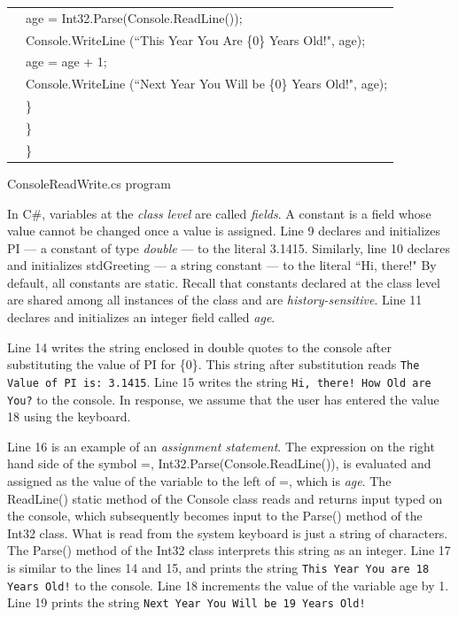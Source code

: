 \begin{program}
\begin{tabular}{ >{\codelinenumfont}c >{\codelistingfont}l}
16 & \hspace{0.6in} age = Int32.Parse(Console.ReadLine()); \\
17 & \hspace{0.6in} Console.WriteLine (``This Year You Are \{0\} Years Old!", age); \\
18 & \hspace{0.6in} age = age + 1; \\
19 & \hspace{0.6in} Console.WriteLine (``Next Year You Will be \{0\} Years Old!", age); \\
20 & \hspace{0.4in} \} \\
21 & \hspace{0.2in} \} \\
22 & \}
\end{tabular}
\caption{ConsoleReadWrite.cs program} \label{tab:ConsoleReadWrite}
\end{program}
\renewcommand{\baselinestretch}{1.0}


In C\#, variables at the \emph{class level} are called
\emph{fields}. A constant is a field whose value cannot be changed
once a value is assigned. Line 9 declares and initializes PI --- a
constant of type \emph{double} --- to the literal 3.1415.
Similarly, line 10 declares and initializes stdGreeting
--- a string constant --- to the literal ``Hi, there!" By default,
all constants are static. Recall that constants declared at the
class level are shared among all instances of the class and are
\emph{history-sensitive}. Line 11 declares and initializes an
integer field called \emph{age}.


Line 14 writes the string enclosed in double quotes to the console
after substituting the value of PI for \{0\}. This string after
substitution reads \texttt{The Value of PI is: 3.1415}. Line 15
writes the string \texttt{Hi, there! How Old are You?} to the
console. In response, we assume that the user has entered the
value 18 using the keyboard.


Line 16 is an example of an \emph{assignment statement}. The
expression on the right hand side of the symbol =,
Int32.Parse(Console.ReadLine()), is evaluated and assigned as the
value of the variable to the left of =, which is \emph{age}. The
ReadLine() static method of the Console class reads and returns
input typed on the console, which subsequently becomes input to
the Parse() method of the Int32 class. What is read from the
system keyboard is just a string of characters. The Parse() method
of the Int32 class interprets this string as an integer. Line 17
is similar to the lines 14 and 15, and prints the string
\texttt{This Year You are 18 Years Old!} to the console. Line 18
increments the value of the variable age by 1. Line 19 prints the
string \texttt{Next Year You Will be 19 Years Old!}


